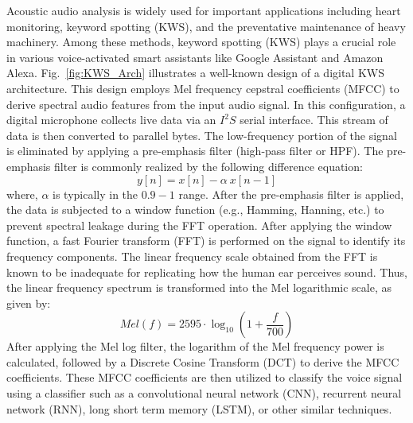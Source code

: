 Acoustic audio analysis is widely used for important applications including heart monitoring, keyword spotting (KWS), and the preventative maintenance of heavy machinery. 
Among these methods, keyword spotting (KWS) plays a crucial role in various voice-activated smart assistants like Google Assistant and Amazon Alexa.
Fig.~\ref{fig:KWS_Arch} illustrates a well-known design of a digital KWS architecture. This design employs Mel frequency cepstral coefficients (MFCC) to derive spectral audio features from the input audio signal.
In this configuration, a digital microphone collects live data via an $I^2S$ serial interface. This stream of data is then converted to parallel bytes. The low-frequency portion of the signal is eliminated by applying a pre-emphasis filter (high-pass filter or HPF). The pre-emphasis filter is commonly realized by the following difference equation:
\begin{equation}
    y[n] = x[n] - \alpha~x[n-1] \label{eq:hpf}
\end{equation}
where, $\alpha$ is typically in the $0.9-1$ range.  
After the pre-emphasis filter is applied, the data is subjected to a window function (e.g., Hamming, Hanning, etc.) to prevent spectral leakage during the FFT operation.
After applying the window function, a fast Fourier transform (FFT) is performed on the signal to identify its frequency components. The linear frequency scale obtained from the FFT is known to be inadequate for replicating how the human ear perceives sound. Thus, the linear frequency spectrum is transformed into the Mel logarithmic scale, as given by:
\begin{equation}
    Mel(f) = 2595\cdot \log_{10}\left({1 + \frac{f}{700}}\right) \label{eq:mel-log}
\end{equation}
After applying the Mel log filter, the logarithm of the Mel frequency power is calculated, followed by a Discrete Cosine Transform (DCT) to derive the MFCC coefficients. These MFCC coefficients are then utilized to classify the voice signal using a classifier such as a convolutional neural network (CNN), recurrent neural network (RNN), long short term memory (LSTM), or other similar techniques.


